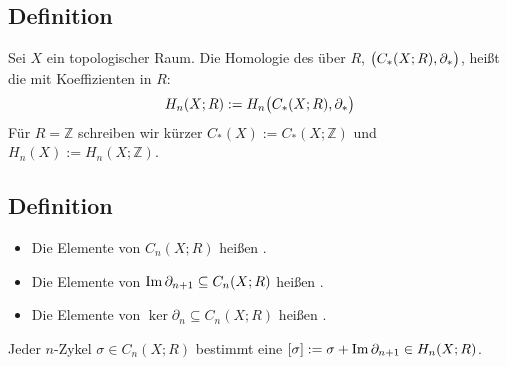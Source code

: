 \subsection[Definition: Singuläre Homologie von $X$]{Definition} %
\label{sub:57}
Sei $X$ ein topologischer Raum. Die Homologie des  über $R$, $\enbrace[\big]{C_*(X;R), \partial_*}$, heißt die
 mit Koeffizienten in $R$:
\[
	H_n(X;R) := H_n \enbrace[\big]{C_*(X;R), \partial_*} 
\]  
Für $R=\mathds{Z}$ schreiben wir kürzer $C_*(X) := C_*(X;\mathds{Z})$ und $H_n(X) := H_n(X;\mathds{Z})$.

\subsection[Definition: $n$-Ketten, $n$-Ränder und $n$-Zykel und Homologieklasse]{Definition} %
\label{sub:58}
\begin{itemize}
	\item Die Elemente von $C_n(X;R)$ heißen .
	\item Die Elemente von $\im \partial_{n+1} \subseteq C_n(X;R)$ heißen .
	\item Die Elemente von $\ker \partial_{n} \subseteq C_n(X;R)$ heißen .
\end{itemize}
Jeder $n$-Zykel $\sigma \in C_n(X;R)$ bestimmt eine  $[\sigma] := \sigma + \im \partial_{n+1} \in H_n(X;R)$. 

